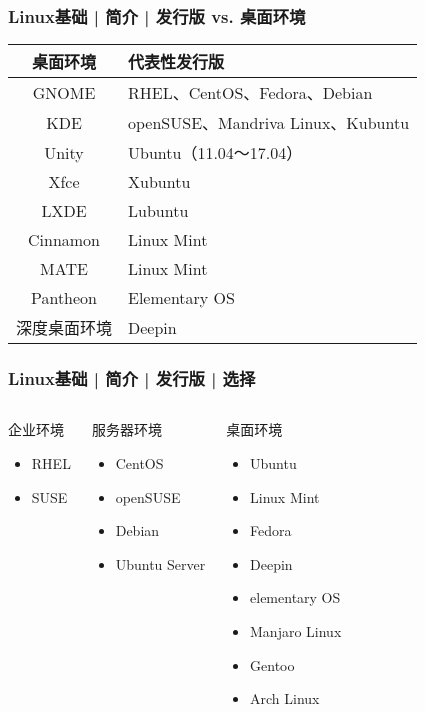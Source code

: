 \begin{frame}
  \frametitle{Linux基础 | 简介 | \alert{发行版 vs. 桌面环境}}
  \begin{table}
    \centering
    \begin{tabular}{cl}
      \hline
      \rowcolor{blue!50}桌面环境 & 代表性发行版\\
      \hline
      GNOME & RHEL、CentOS、Fedora、Debian\\
      KDE & openSUSE、Mandriva Linux、Kubuntu\\
      Unity & Ubuntu（11.04～17.04）\\
      Xfce & Xubuntu\\
      LXDE & Lubuntu\\
      Cinnamon & Linux Mint\\
      MATE & Linux Mint\\
      Pantheon & Elementary OS\\
      深度桌面环境 & Deepin\\
      \hline
    \end{tabular}
  \end{table}
\end{frame}

\begin{frame}
  \frametitle{Linux基础 | 简介 | 发行版 | 选择}
  \begin{columns}
  \begin{block}{企业环境}
    \begin{itemize}
      \item RHEL
      \item SUSE
    \end{itemize}
  \end{block}
  \pause
  \begin{block}{服务器环境}
    \begin{itemize}
      \item CentOS
      \item openSUSE
      \item Debian
      \item Ubuntu Server
    \end{itemize}
  \end{block}
  \pause
  \begin{block}{桌面环境}
    \begin{itemize}
      \item Ubuntu
      \item Linux Mint
      \item Fedora
      \item Deepin
      \item elementary OS
      \item Manjaro Linux
      \item Gentoo
      \item Arch Linux
    \end{itemize}
  \end{block}
\end{columns}
\end{frame}

